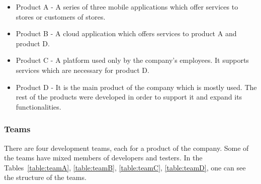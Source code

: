 \begin{itemize}
\item Product A - A series of three mobile applications which offer services to stores or customers of stores.
\item Product B - A cloud application which offers services to product A and product D.
\item Product C - A platform used only by the company's employees. It supports services which are necessary for product D.
\item Product D - It is the main product of the company which is mostly used. The rest of the products were developed in order to support it and expand its functionalities.

\end{itemize}

\subsubsection{Teams}
There are four development teams, each for a product of the company. Some of the teams have mixed members of developers and testers. In the Tables~\ref{table:teamA}, \ref{table:teamB}, \ref{table:teamC}, \ref{table:teamD}, one can see the structure of the teams. \\

